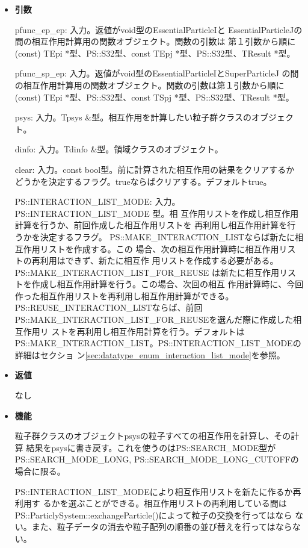 \begin{itemize}

\item {\bf 引数}

pfunc\_ep\_ep: 入力。返値がvoid型のEssentialParticleIと
EssentialParticleJの間の相互作用計算用の関数オブジェクト。関数の引数は
第１引数から順に(const) TEpi *型、PS::S32型、const
TEpj *型、PS::S32型、TResult *型。

pfunc\_sp\_ep: 入力。返値がvoid型のEssentialParticleIとSuperParticleJ
の間の相互作用計算用の関数オブジェクト。関数の引数は第１引数から順に
(const) TEpi *型、PS::S32型、const TSpj *型、PS::S32型、TResult *型。

psys: 入力。Tpsys \&型。相互作用を計算したい粒子群クラスのオブジェクト。

dinfo: 入力。Tdinfo \&型。領域クラスのオブジェクト。

clear: 入力。const bool型。前に計算された相互作用の結果をクリアするか
どうかを決定するフラグ。trueならばクリアする。デフォルトtrue。

PS::INTERACTION\_LIST\_MODE: 入力。PS::INTERACTION\_LIST\_MODE 型。相
互作用リストを作成し相互作用計算を行うか、前回作成した相互作用リストを
再利用し相互作用計算を行うかを決定するフラグ。
PS::MAKE\_INTERACTION\_LISTならば新たに相互作用リストを作成する。この
場合、次の相互作用計算時に相互作用リストの再利用はできず、新たに相互作
用リストを作成する必要がある。PS::MAKE\_INTERACTION\_LIST\_FOR\_REUSE
は新たに相互作用リストを作成し相互作用計算を行う。この場合、次回の相互
作用計算時に、今回作った相互作用リストを再利用し相互作用計算ができる。
PS::REUSE\_INTERACTION\_LISTならば、前回
PS::MAKE\_INTERACTION\_LIST\_FOR\_REUSEを選んだ際に作成した相互作用リ
ストを再利用し相互作用計算を行う。デフォルトは
PS::MAKE\_INTERACTION\_LIST。PS::INTERACTION\_LIST\_MODEの詳細はセクショ
ン\ref{sec:datatype_enum_interaction_list_mode}を参照。

\item {\bf 返値}

なし

\item {\bf 機能}

粒子群クラスのオブジェクトpsysの粒子すべての相互作用を計算し、その計算
結果をpsysに書き戻す。これを使うのはPS::SEARCH\_MODE型が
PS::SEARCH\_MODE\_LONG, PS::SEARCH\_MODE\_LONG\_CUTOFFの場合に限る。

PS::INTERACTION\_LIST\_MODEにより相互作用リストを新たに作るか再利用す
るかを選ぶことができる。相互作用リストの再利用している間は
PS::ParticlySystem::exchangeParticle()によって粒子の交換を行ってはなら
ない。また、粒子データの消去や粒子配列の順番の並び替えを行ってはならな
い。


\end{itemize}

